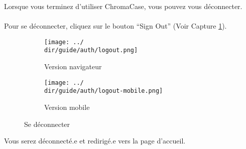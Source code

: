 Lorsque vous terminez d’utiliser ChromaCase, vous pouvez vous déconnecter.
\\\\
Pour se déconnecter, cliquez sur le bouton “Sign Out” (Voir Capture \ref{fig:logout}).

\begin{figure}[H]
	\begin{subfigure}[b]{0.7\textwidth}
		\texttt{[image: ../\\dir/guide/auth/logout.png]}
		\caption{Version navigateur}
	\end{subfigure}
	\begin{subfigure}[b]{0.25\textwidth}
		\texttt{[image: ../\\dir/guide/auth/logout-mobile.png]}
		\caption{Version mobile}
	\end{subfigure}
	\caption{Se déconnecter}
	\label{fig:logout}
\end{figure}

Vous serez déconnecté.e et redirigé.e vers la page d’accueil.